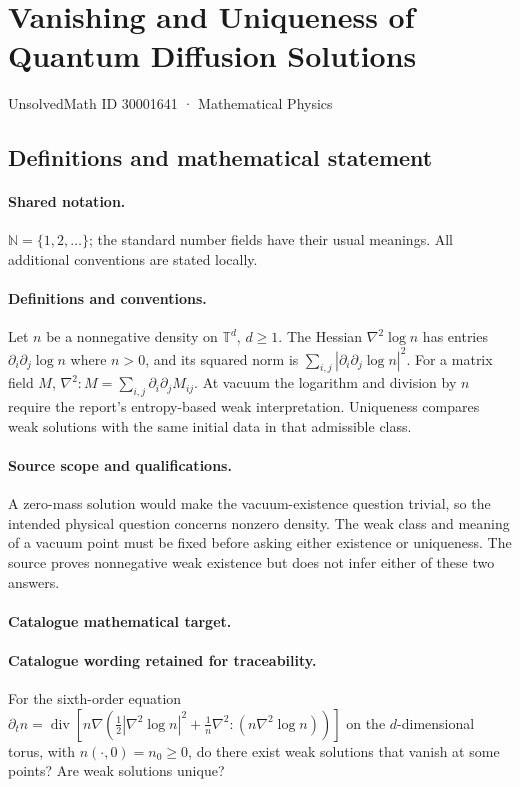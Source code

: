 \documentclass[11pt]{article}
\begin{document}
\setcounter{section}{30001640}
\section{Vanishing and Uniqueness of Quantum Diffusion Solutions}\label{30001641}
{\small UnsolvedMath ID 30001641 · Mathematical Physics}
\subsection{Definitions and mathematical statement}

\paragraph{Shared notation.}$\mathbb N=\{1,2,\ldots\}$; the standard number fields have their usual meanings. All additional conventions are stated locally.


\paragraph{Definitions and conventions.} Let $n$ be a nonnegative density on $\mathbb T^d$, $d\ge1$. The Hessian $\nabla^2\log n$ has entries $\partial_i\partial_j\log n$ where $n>0$, and its squared norm is $\sum_{i,j}|\partial_i\partial_j\log n|^2$. For a matrix field $M$, $\nabla^2\!:\!M=\sum_{i,j}\partial_i\partial_jM_{ij}$. At vacuum the logarithm and division by $n$ require the report's entropy-based weak interpretation. Uniqueness compares weak solutions with the same initial data in that admissible class.

\paragraph{Source scope and qualifications.} A zero-mass solution would make the vacuum-existence question trivial, so the intended physical question concerns nonzero density. The weak class and meaning of a vacuum point must be fixed before asking either existence or uniqueness. The source proves nonnegative weak existence but does not infer either of these two answers.

\paragraph{Catalogue mathematical target.}
\paragraph{Catalogue wording retained for traceability.}
For the sixth-order equation $\partial_t n=\operatorname{div}\!\left[n\nabla\left(\frac12|\nabla^2\log n|^2+\frac1n\nabla^2\!:\!(n\nabla^2\log n)\right)\right]$ on the $d$-dimensional torus, with $n(\cdot,0)=n_0\geq0$, do there exist weak solutions that vanish at some points? Are weak solutions unique?
\end{document}

